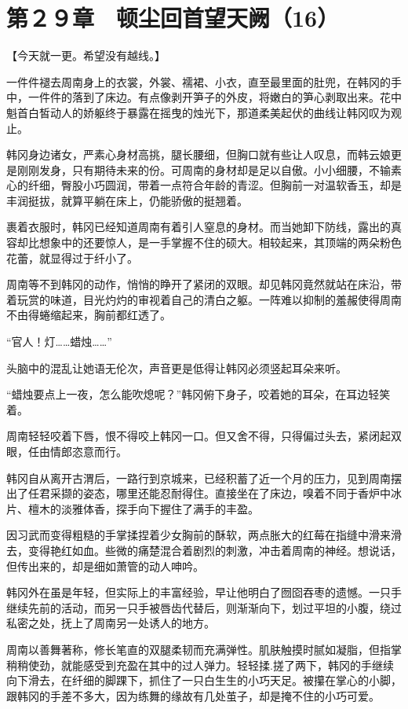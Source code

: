 \section{第２９章　顿尘回首望天阙（16）}

【今天就一更。希望没有越线。】

一件件褪去周南身上的衣裳，外裳、襦裙、小衣，直至最里面的肚兜，在韩冈的手中，一件件的落到了床边。有点像剥开笋子的外皮，将嫩白的笋心剥取出来。花中魁首白皙动人的娇躯终于暴露在摇曳的烛光下，那道柔美起伏的曲线让韩冈叹为观止。

韩冈身边诸女，严素心身材高挑，腿长腰细，但胸口就有些让人叹息，而韩云娘更是刚刚发身，只有期待未来的份。可周南的身材却是足以自傲。小小细腰，不输素心的纤细，臀股小巧圆润，带着一点符合年龄的青涩。但胸前一对温软香玉，却是丰润挺拔，就算平躺在床上，仍能骄傲的挺翘着。

裹着衣服时，韩冈已经知道周南有着引人窒息的身材。而当她卸下防线，露出的真容却比想象中的还要惊人，是一手掌握不住的硕大。相较起来，其顶端的两朵粉色花蕾，就显得过于纤小了。

周南等不到韩冈的动作，悄悄的睁开了紧闭的双眼。却见韩冈竟然就站在床沿，带着玩赏的味道，目光灼灼的审视着自己的清白之躯。一阵难以抑制的羞赧使得周南不由得蜷缩起来，胸前都红透了。

“官人！灯……蜡烛……”

头脑中的混乱让她语无伦次，声音更是低得让韩冈必须竖起耳朵来听。

“蜡烛要点上一夜，怎么能吹熄呢？”韩冈俯下身子，咬着她的耳朵，在耳边轻笑着。

周南轻轻咬着下唇，恨不得咬上韩冈一口。但又舍不得，只得偏过头去，紧闭起双眼，任由情郎恣意而行。

韩冈自从离开古渭后，一路行到京城来，已经积蓄了近一个月的压力，见到周南摆出了任君采撷的姿态，哪里还能忍耐得住。直接坐在了床边，嗅着不同于香炉中冰片、檀木的淡雅体香，探手向下握住了满手的丰盈。

因习武而变得粗糙的手掌揉捏着少女胸前的酥软，两点胀大的红莓在指缝中滑来滑去，变得艳红如血。些微的痛楚混合着剧烈的刺激，冲击着周南的神经。想说话，但传出来的，却是细如萧管的动人呻吟。

韩冈外在虽是年轻，但实际上的丰富经验，早让他明白了囫囵吞枣的遗憾。一只手继续先前的活动，而另一只手被唇齿代替后，则渐渐向下，划过平坦的小腹，绕过私密之处，抚上了周南另一处诱人的地方。

周南以善舞著称，修长笔直的双腿柔韧而充满弹性。肌肤触摸时腻如凝脂，但指掌稍稍使劲，就能感受到充盈在其中的过人弹力。轻轻揉.搓了两下，韩冈的手继续向下滑去，在纤细的脚踝下，抓住了一只白生生的小巧天足。被攥在掌心的小脚，跟韩冈的手差不多大，因为练舞的缘故有几处茧子，却是掩不住的小巧可爱。

